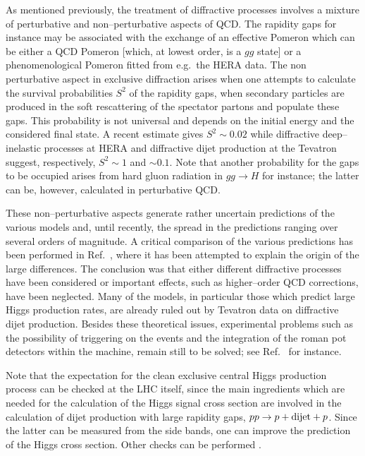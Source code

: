 As mentioned previously, the treatment of diffractive processes involves a
mixture of perturbative and non--perturbative aspects of QCD. The rapidity gaps
for instance may be associated with the exchange of an effective Pomeron which
can be either a QCD Pomeron [which, at lowest order, is a $gg$ state] or a
phenomenological Pomeron fitted from e.g.~the HERA data. The non perturbative
aspect in exclusive diffraction arises when one attempts to calculate the
survival probabilities $S^2$ of the rapidity gaps, when secondary particles are
produced in the soft rescattering of the spectator partons and populate these
gaps. This probability is not universal and depends on the initial energy and
the considered final state. A recent estimate gives $S^2\!\sim\! 0.02$
while diffractive deep--inelastic processes at HERA and diffractive dijet
production at the Tevatron suggest, respectively, $S^2 \sim 1$ and $\sim 0.1$. 
Note that another probability for the gaps to be occupied arises from hard
gluon radiation in $gg \to H$ for instance; the latter can be, however,
calculated in perturbative QCD.\s

These non--perturbative aspects generate rather uncertain predictions of the
various models and, until recently, the spread in the predictions ranging over
several orders of magnitude.  A critical comparison of the various predictions
has been performed in Ref.~\cite{Valery-myths}, where it has been attempted to
explain the origin of the large differences. The conclusion was that either
different diffractive processes have been considered or important effects, such
as higher--order QCD corrections, have been neglected.  Many of the models, in
particular those which predict large Higgs production rates, are already ruled
out by Tevatron data on diffractive dijet production. Besides these theoretical
issues, experimental problems such as the possibility of triggering on the
events and the integration of the roman pot detectors within the machine,
remain still to be solved; see Ref.~\cite{diffr-Houches} for instance. \s

Note that the expectation for the clean exclusive central Higgs
production process can be checked at the LHC itself, since the main ingredients
which are needed for the calculation of the Higgs signal cross section are
involved in the calculation of dijet production with large rapidity gaps, $pp
\to p+ {\rm dijet}+p$. Since the latter can be measured from the side bands, one
can improve the prediction of the Higgs cross section. Other checks
can be performed \cite{diffr2}.\s 

